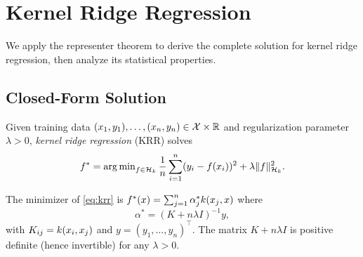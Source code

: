 \documentclass[11pt,a4paper]{article}
\begin{document}

\section{Kernel Ridge Regression}
\label{sec:krr}

We apply the representer theorem to derive the complete solution
for kernel ridge regression, then analyze its statistical properties.

\subsection{Closed-Form Solution}

\begin{definition}
\label{def:krr}
Given training data $(x_1, y_1), \ldots, (x_n, y_n) \in
\mathcal{X} \times \mathbb{R}$ and regularization parameter $\lambda > 0$,
\emph{kernel ridge regression} (KRR) solves
\begin{equation}
\label{eq:krr}
f^* = \operatorname{arg\,min}_{f \in \mathcal{H}_k} \frac{1}{n} \sum_{i=1}^n
(y_i - f(x_i))^2 + \lambda \|f\|_{\mathcal{H}_k}^2.
\end{equation}
\end{definition}

\begin{theorem}
\label{thm:krr-solution}
The minimizer of \eqref{eq:krr} is $f^*(x) = \sum_{j=1}^n
\alpha_j^* k(x_j, x)$ where
\begin{equation}
\label{eq:krr-alpha}
\alpha^* = (K + n\lambda I)^{-1} y,
\end{equation}
with $K_{ij} = k(x_i, x_j)$ and $y = (y_1, \ldots, y_n)^\top$.
The matrix $K + n\lambda I$ is positive definite (hence invertible)
for any $\lambda > 0$.
\end{theorem}
\end{document}
